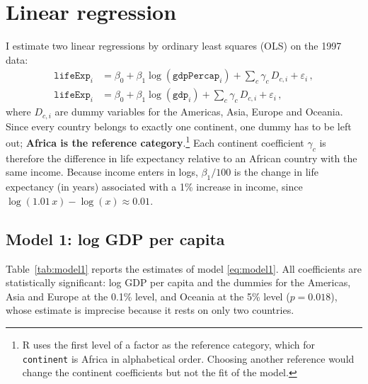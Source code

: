 \documentclass[a4paper,12pt]{article}
\begin{document}
\section{Linear regression}
\label{sec:regression}

I estimate two linear regressions by ordinary least squares (OLS) on the 1997 data:
\begin{align}
    \texttt{lifeExp}_i &= \beta_0 + \beta_1 \log(\texttt{gdpPercap}_i) + \sum_{c} \gamma_c \, D_{c,i} + \varepsilon_i \, , \label{eq:model1} \\
    \texttt{lifeExp}_i &= \beta_0 + \beta_1 \log(\texttt{gdp}_i) + \sum_{c} \gamma_c \, D_{c,i} + \varepsilon_i \, , \label{eq:model2}
\end{align}
where $D_{c,i}$ are dummy variables for the Americas, Asia, Europe and Oceania. Since every country belongs to exactly one continent, one dummy has to be left out; \textbf{Africa is the reference category}.\footnote{
    R uses the first level of a factor as the reference category, which for \texttt{continent} is Africa in alphabetical order. Choosing another reference would change the continent coefficients but not the fit of the model.
}
Each continent coefficient $\gamma_c$ is therefore the difference in life expectancy relative to an African country with the same income. Because income enters in logs, $\beta_1/100$ is the change in life expectancy (in years) associated with a 1\% increase in income, since $\log(1.01\,x) - \log(x) \approx 0.01$.

\subsection{Model 1: log GDP per capita}

Table~\ref{tab:model1} reports the estimates of model \eqref{eq:model1}. All coefficients are statistically significant: log GDP per capita and the dummies for the Americas, Asia and Europe at the 0.1\% level, and Oceania at the 5\% level ($p = 0.018$), whose estimate is imprecise because it rests on only two countries.


\end{document}
